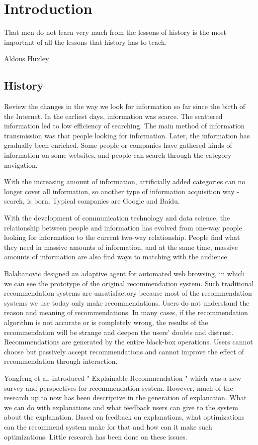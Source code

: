 \section{Introduction}
\label{ch:intro}

\epigraph{That men do not learn very much from the lessons of history is the most important of all the lessons that history has to teach.}{Aldous Huxley}

\subsection{History}
Review the changes in the way we look for information so far since the birth of the Internet. In the earliest days, information was scarce. The scattered information led to low efficiency of searching. The main method of information transmission was that people looking for information. Later, the information has gradually been enriched. Some people or companies have gathered kinds of information on some websites, and people can search through the category navigation.
\par With the increasing amount of information, artificially added categories can no longer cover all information, so another type of information acquisition way - search, is born. Typical companies are Google and Baidu.
\par With the development of communication technology and data science, the relationship between people and information has evolved from one-way people looking for information to the current two-way relationship. People find what they need in massive amounts of information, and at the same time, massive amounts of information are also find ways to matching with the audience.
\par Balabanovic designed an adaptive agent for automated web browsing\cite{balabanovic1996adaptive}, in which we can see the prototype of the original recommendation system. Such traditional recommendation systems are unsatisfactory because most of the recommendation systems we use today only make recommendations. Users do not understand the reason and meaning of recommendations. In many cases, if the recommendation algorithm is not accurate or is completely wrong, the results of the recommendation will be strange and deepen the users' doubts and distrust. Recommendations are generated by the entire black-box operations. Users cannot choose but passively accept recommendations and cannot improve the effect of recommendation through interaction.
\par Yongfeng et al. introduced " Explainable Recommendation " which was a new survey and perspectives for recommendation system\cite{zhang2018explainable}. However, much of the research up to now has been descriptive in the generation of explanation. What we can do with explanations and what feedback users can give to the system about the explanation. Based on feedback on explanations, what optimizations can the recommend system make for that and how can it make such optimizations. Little research has been done on these issues.
